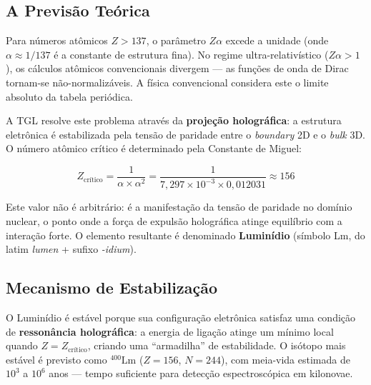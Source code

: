 \documentclass[12pt,a4paper,twoside]{article}
\newcommand{\alphaii}{\alpha^{2}}
\newcommand{\boundary}{\textit{boundary}}
\newcommand{\bulk}{\textit{bulk}}
\begin{document}
\subsection{A Previs\~ao Te\'orica}

Para n\'umeros at\^omicos $Z > 137$, o par\^ametro $Z\alpha$ excede a unidade (onde $\alpha \approx 1/137$ \'e a constante de estrutura fina). No regime ultra-relativ\'istico ($Z\alpha > 1$), os c\'alculos at\^omicos convencionais divergem --- as fun\c{c}\~oes de onda de Dirac tornam-se n\~ao-normaliz\'aveis. A f\'isica convencional considera este o limite absoluto da tabela peri\'odica.

A TGL resolve este problema atrav\'es da \textbf{proje\c{c}\~ao hologr\'afica}: a estrutura eletr\^onica \'e estabilizada pela tens\~ao de paridade entre o \boundary{} 2D e o \bulk{} 3D. O n\'umero at\^omico cr\'itico \'e determinado pela Constante de Miguel:

\begin{equationbox}[title={N\'umero At\^omico Cr\'itico / Critical Atomic Number}]
\begin{equation}
\boxed{Z_{\text{cr\'itico}} = \frac{1}{\alpha \times \alphaii} = \frac{1}{7{,}297 \times 10^{-3} \times 0{,}012031} \approx 156}
\label{eq:z_critical}
\end{equation}
\end{equationbox}

\noindent Este valor n\~ao \'e arbitr\'ario: \'e a manifesta\c{c}\~ao da tens\~ao de paridade no dom\'inio nuclear, o ponto onde a for\c{c}a de expuls\~ao hologr\'afica atinge equil\'ibrio com a intera\c{c}\~ao forte. O elemento resultante \'e denominado \textbf{Lumin\'idio} (s\'imbolo Lm, do latim \textit{lumen} + sufixo \textit{-idium}).



\subsection{Mecanismo de Estabiliza\c{c}\~ao}

O Lumin\'idio \'e est\'avel porque sua configura\c{c}\~ao eletr\^onica satisfaz uma condi\c{c}\~ao de \textbf{resson\^ancia hologr\'afica}: a energia de liga\c{c}\~ao atinge um m\'inimo local quando $Z = Z_{\text{cr\'itico}}$, criando uma ``armadilha'' de estabilidade. O is\'otopo mais est\'avel \'e previsto como ${}^{400}\text{Lm}$ ($Z = 156$, $N = 244$), com meia-vida estimada de $10^3$ a $10^6$ anos --- tempo suficiente para detec\c{c}\~ao espectrosc\'opica em kilonovae.
\end{document}
